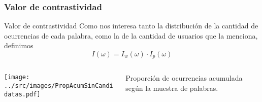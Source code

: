 \begin{frame}[t]\frametitle{Valor de contrastividad}
    \begin{block}{Valor de contrastividad}
    Como nos interesa tanto la distribución de la cantidad de ocurrencias de cada palabra, como la de la cantidad de usuarios que la menciona, definimos   
    \begin{equation}
    I(\omega) =  I_w (\omega) \cdot I_p(\omega)
    \label{eq:ivalor}
    \end{equation}
    \end{block}    

    \begin{columns}
        \begin{column}{.7\linewidth}
        \texttt{[image: ../src/images/PropAcumSinCandidatas.pdf]}
        \end{column}
        \begin{column}{.3\linewidth}
        Proporción de ocurrencias acumulada según la muestra de palabras. %
        \label{fig:propAcum}
        \end{column}
      \end{columns}
   

\end{frame}